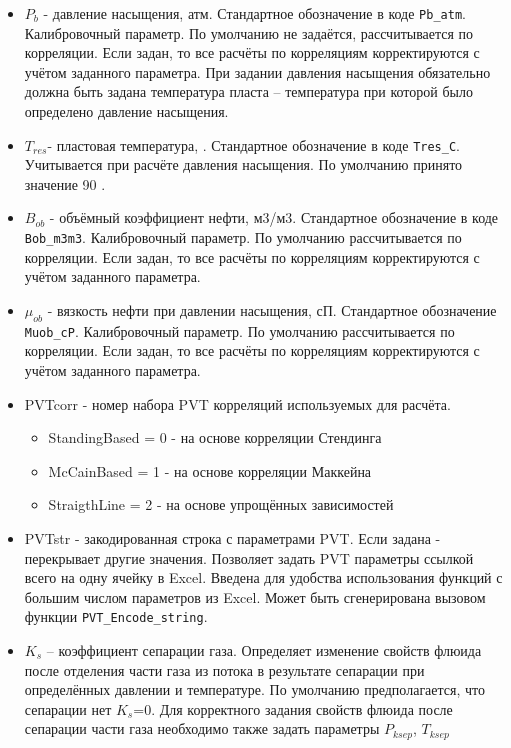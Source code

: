 \begin{itemize}
\item $P_b$ - давление насыщения, атм. Стандартное обозначение в коде \texttt{Pb_atm}. Калибровочный параметр. По умолчанию не задаётся, рассчитывается по корреляции. Если задан, то все расчёты по корреляциям корректируются с учётом заданного параметра. При задании давления насыщения обязательно должна быть задана температура пласта – температура при которой было определено давление насыщения. 

\item $T_{res}$- пластовая температура, \textcelsius. Стандартное обозначение в коде \texttt{Tres_C}. Учитывается при расчёте давления насыщения. По умолчанию принято значение 90 \textcelsius.

\item $B_{ob}$ - объёмный коэффициент нефти, м3/м3. Стандартное обозначение в коде \texttt{Bob_m3m3}. Калибровочный параметр. По умолчанию рассчитывается по корреляции. Если задан, то все расчёты по корреляциям корректируются с учётом заданного параметра.

\item $\mu_{ob}$ - вязкость нефти при давлении насыщения, сП. Стандартное обозначение \texttt{Muob_cP}. Калибровочный параметр. По умолчанию рассчитывается по корреляции. Если задан, то все расчёты по корреляциям корректируются с учётом заданного параметра.

\item PVTcorr - номер набора PVT корреляций используемых для расчёта. 
\begin{itemize}	
	\item 	StandingBased = 0 - на основе корреляции Стендинга
	\item 	McCainBased = 1 - на основе корреляции Маккейна
	\item 	StraigthLine = 2 - на основе упрощённых зависимостей
\end{itemize}

\item PVTstr - закодированная строка с параметрами PVT. Если задана - перекрывает другие значения. Позволяет задать PVT параметры ссылкой всего на одну ячейку в Excel. Введена для удобства использования функций с большим числом параметров из Excel. Может быть сгенерирована вызовом функции \texttt{PVT_Encode_string}.

\item $K_s$ – коэффициент сепарации газа. Определяет изменение свойств флюида после отделения части газа из потока в результате сепарации при определённых давлении и температуре. По умолчанию предполагается, что сепарации нет $K_s$=0. Для корректного задания свойств флюида после сепарации части газа необходимо также задать параметры $P_{ksep}$, $T_{ksep}$


\end{itemize}
